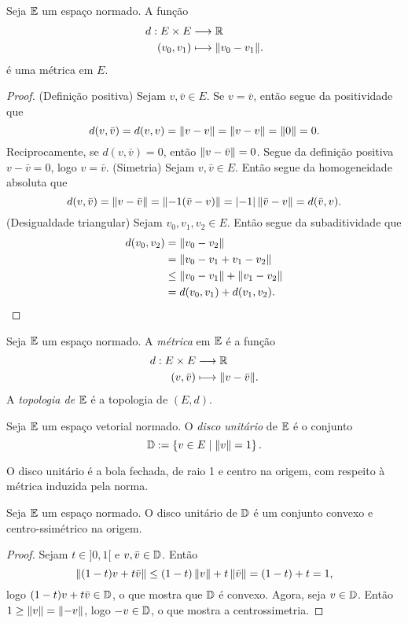 \begin{prop}
Seja $\mathbb{E}$ um espaço normado. A função
	\begin{align*}
	{d}: {E \times E} &\longrightarrow {\mathbb{R}} \\{(v_0,v_1)} &\longmapsto {\left\Vert{v_0 - v_1}\right\Vert}.
	\end{align*}
é uma métrica em $E$.
\end{prop}
\begin{proof}
(Definição positiva) Sejam $v,\bar v \in E$. Se $v = \bar v$, então segue da positividade que
	\begin{equation*}
	d(v,\bar v) = d(v,v) = \left\Vert{v - v}\right\Vert = \left\Vert{v-v}\right\Vert=\left\Vert{0}\right\Vert=0.
	\end{equation*}
Reciprocamente, se $d(v,\bar v)=0$, então $\left\Vert{v-\bar v}\right\Vert=0$. Segue da definição positiva $v-\bar v=0$, logo $v=\bar v$.
(Simetria)  Sejam $v,\bar v \in E$. Então segue da homogeneidade absoluta que
	\begin{equation*}
	d(v,\bar v)=\left\Vert{v-\bar v}\right\Vert=\left\Vert{-1(\bar v -v)}\right\Vert=\left\vert{-1}\right\vert\left\Vert{\bar v - v}\right\Vert=d(\bar v,v).
	\end{equation*}
(Desigualdade triangular) Sejam $v_0,v_1,v_2 \in E$. Então segue da subaditividade que
	\begin{align*}
	d(v_0,v_2) &= \left\Vert{v_0-v_2}\right\Vert \\
		&=\left\Vert{v_0-v_1+v_1-v_2}\right\Vert \\
		&\leq \left\Vert{v_0-v_1}\right\Vert+\left\Vert{v_1-v_2}\right\Vert \\
		&=d(v_0,v_1)+d(v_1,v_2).
	\end{align*}	
\end{proof}

\begin{defi}
Seja $\mathbb{E}$ um espaço normado. A \emph{métrica} em $\mathbb{E}$ é a função
	\begin{align*}
	{d}: {E \times E} &\longrightarrow {\mathbb{R}} \\{(v,\bar v)} &\longmapsto {\left\Vert{v - \bar v}\right\Vert}.
	\end{align*}	
A \emph{topologia de $\mathbb{E}$} é a topologia de $(E,d)$.
\end{defi}

\begin{defi}
Seja $\mathbb{E}$ um espaço vetorial normado. O \emph{disco unitário} de $\mathbb{E}$ é o conjunto
	\begin{equation*}
	\mathbb{D} := \left\{v \in E \;\middle\vert\; \left\Vert{v}\right\Vert=1 \right\}.
	\end{equation*}
\end{defi}

O disco unitário é a bola fechada, de raio 1 e centro na origem, com respeito à métrica induzida pela norma.

\begin{prop}
Seja $\mathbb{E}$ um espaço normado. O disco unitário de $\mathbb{D}$ é um conjunto convexo e centro-ssimétrico na origem.
\end{prop}
\begin{proof}
Sejam $t \in ]0,1[$ e $v,\bar v \in \mathbb{D}$. Então
	\begin{equation*}
	\left\Vert{(1-t)v+t\bar v}\right\Vert \leq (1-t)\left\Vert{v}\right\Vert+t\left\Vert{\bar v}\right\Vert =(1-t)+t=1,
	\end{equation*}
logo $(1-t)v+t\bar v \in \mathbb{D}$, o que mostra que $\mathbb{D}$ é convexo. Agora, seja $v \in \mathbb{D}$. Então $1 \geq \left\Vert{v}\right\Vert = \left\Vert{-v}\right\Vert$, logo $-v \in \mathbb{D}$, o que mostra a centrossimetria.
\end{proof}

